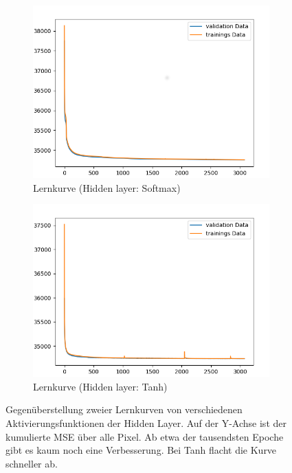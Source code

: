 \begin{figure}[ht]
\centering
\begin{subfigure}{0.5\textwidth}
\centering
\includegraphics[width=\linewidth]{pics/lernkurve_activationHidden-softmax_activationOutput-softmax}
\caption{Lernkurve (Hidden layer: Softmax)}
\label{fig:lernkurveSoftmax}
\end{subfigure}%
\begin{subfigure}{0.5\textwidth}
\centering
\includegraphics[width=\linewidth]{pics/lernkurve_activationHidden-tanh_activationOutput-softmax}
\caption{Lernkurve (Hidden layer: Tanh)}
\label{fig:lernkurveTanh}
\end{subfigure}%
\caption[Lernkurven verschiedener Aktivierungsfkt. der Hidden Layer]{Gegenüberstellung zweier Lernkurven von verschiedenen Aktivierungsfunktionen der Hidden Layer. Auf der Y-Achse ist der kumulierte MSE über alle Pixel. Ab etwa der tausendsten Epoche gibt es kaum noch eine Verbesserung. Bei Tanh flacht die Kurve schneller ab.}
\label{fig:lernkurven}
\end{figure}




